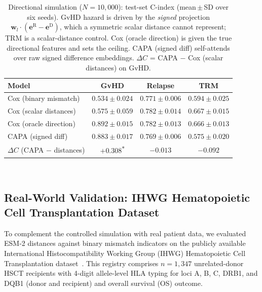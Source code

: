 \documentclass[11pt,a4paper]{article}
\begin{document}
\begin{table}[ht]
\centering
\caption{Directional simulation ($N=10{,}000$): test-set C-index
(mean\,$\pm$\,SD over six seeds).  GvHD hazard is driven by the \emph{signed}
projection $\mathbf{w}_l\!\cdot\!(\mathbf{e}^{\mathrm{R}}-\mathbf{e}^{\mathrm{D}})$,
which a symmetric scalar distance cannot represent; TRM is a scalar-distance
control.  Cox (oracle direction) is given the true directional features and
sets the ceiling.  CAPA (signed diff) self-attends over raw signed difference
embeddings.  $\Delta C$ = CAPA $-$ Cox (scalar distances) on GvHD.}
\label{tab:directional}
\smallskip
\begin{tabular}{lccc}
\toprule
Model & GvHD & Relapse & TRM \\
\midrule
Cox (binary mismatch)   & $0.534 \pm 0.024$ & $0.771 \pm 0.006$ & $0.594 \pm 0.025$ \\
Cox (scalar distances)  & $0.575 \pm 0.059$ & $0.782 \pm 0.014$ & $\mathbf{0.667 \pm 0.015}$ \\
Cox (oracle direction)  & $0.892 \pm 0.015$ & $0.782 \pm 0.013$ & $0.666 \pm 0.013$ \\
CAPA (signed diff)      & $\mathbf{0.883 \pm 0.017}$ & $0.769 \pm 0.006$ & $0.575 \pm 0.020$ \\
\midrule
$\Delta C$ (CAPA $-$ distances) & $\mathbf{+0.308}$\textsuperscript{$\ast$} & $-0.013$ & $-0.092$ \\
\bottomrule
\end{tabular}
\smallskip\\
\end{table}

\subsection{Real-World Validation: IHWG Hematopoietic Cell Transplantation Dataset}
\label{sec:ihwg}

To complement the controlled simulation with real patient data, we evaluated
ESM-2 distances against binary mismatch indicators on the publicly available
International Histocompatibility Working Group (IHWG) Hematopoietic Cell
Transplantation dataset~\citep{Hurley2003IHWG}.  This registry comprises
$n = 1{,}347$ unrelated-donor HSCT recipients with 4-digit allele-level HLA
typing for loci A, B, C, DRB1, and DQB1 (donor and recipient) and overall
survival (OS) outcome.
\end{document}
